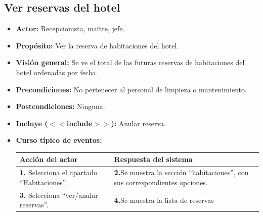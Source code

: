 \documentclass[spanish,a4paper,11pt, twoside]{report}	%
\begin{document}
	\subsection{Ver reservas del hotel}
		\begin{itemize}
			\item \textbf{Actor:} Recepcionista, maître, jefe.
			\item \textbf{Propósito:} Ver la reserva de habitaciones del hotel.
			\item \textbf{Visión general:} Se ve el total de las futuras reservas de
				habitaciones del hotel ordenadas por fecha.
			\item \textbf{Precondiciones:} No pertenecer al personal de limpieza o mantenimiento.
			\item \textbf{Postcondiciones:} Ninguna.
			\item \textbf{Incluye ($<<$include$>>$):} Anular reserva.
			\item \textbf{Curso típico de eventos:} 	\\
				\begin{tabular}{|p{6cm}||p{6cm}|}
				\hline
				\textbf{Acción del actor} & \textbf{Respuesta del sistema} \\ \hline
				\textbf{1.} Selecciona el apartado ``Habitaciones''. & 
				\textbf{2.}Se muestra la sección ``habitaciones'', con sus correspondientes opciones. \\ \hline 
				\textbf{3.} Selecciona ``ver/anular reservas''. & \textbf{4.}Se muestra la lista de reservas \\ \hline
			\end{tabular}
			\\
		\end {itemize}

\end{document}
